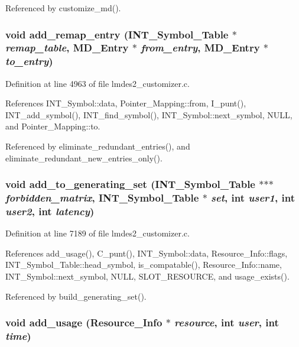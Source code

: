 Referenced by customize\_\-md().
\subsubsection{\setlength{\rightskip}{0pt plus 5cm}void add\_\-remap\_\-entry (\bf{INT\_\-Symbol\_\-Table} $\ast$ {\em remap\_\-table}, \bf{MD\_\-Entry} $\ast$ {\em from\_\-entry}, \bf{MD\_\-Entry} $\ast$ {\em to\_\-entry})}\label{lmdes2__customizer_8c_81b5e74760544ee45c3246205a9db199}




Definition at line 4963 of file lmdes2\_\-customizer.c.

References INT\_\-Symbol::data, Pointer\_\-Mapping::from, I\_\-punt(), INT\_\-add\_\-symbol(), INT\_\-find\_\-symbol(), INT\_\-Symbol::next\_\-symbol, NULL, and Pointer\_\-Mapping::to.

Referenced by eliminate\_\-redundant\_\-entries(), and eliminate\_\-redundant\_\-new\_\-entries\_\-only().
\subsubsection{\setlength{\rightskip}{0pt plus 5cm}void add\_\-to\_\-generating\_\-set (\bf{INT\_\-Symbol\_\-Table} $\ast$$\ast$$\ast$ {\em forbidden\_\-matrix}, \bf{INT\_\-Symbol\_\-Table} $\ast$ {\em set}, int {\em user1}, int {\em user2}, int {\em latency})}\label{lmdes2__customizer_8c_c56e6d5cf030a514b50156a8d5705302}




Definition at line 7189 of file lmdes2\_\-customizer.c.

References add\_\-usage(), C\_\-punt(), INT\_\-Symbol::data, Resource\_\-Info::flags, INT\_\-Symbol\_\-Table::head\_\-symbol, is\_\-compatable(), Resource\_\-Info::name, INT\_\-Symbol::next\_\-symbol, NULL, SLOT\_\-RESOURCE, and usage\_\-exists().

Referenced by build\_\-generating\_\-set().
\subsubsection{\setlength{\rightskip}{0pt plus 5cm}void add\_\-usage (\bf{Resource\_\-Info} $\ast$ {\em resource}, int {\em user}, int {\em time})}\label{lmdes2__customizer_8c_8c6ba9919f402479699c8861c5e39512}




